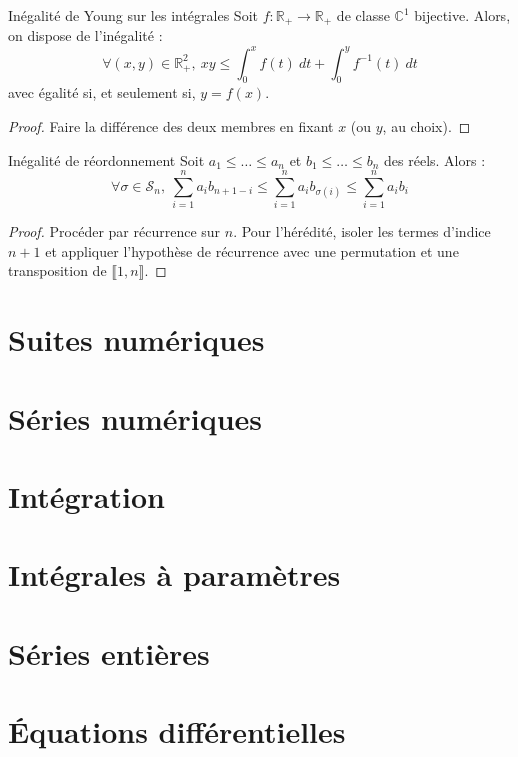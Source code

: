 \documentclass[french]{article}
\newcommand{\R}{\mathbb{R}}
\newcommand{\C}{\mathbb{C}}
\newcommand{\inv}{^{-1}}
\theoremstyle{definition}
\begin{document}
\begin{lem}{Inégalité de Young sur les intégrales}
	Soit $f:\R_+\to\R_+$ de classe $\C^1$ bijective. Alors, on dispose de l'inégalité : $$\forall (x,y)\in\R_+^2,\ xy\leqslant\int_{0}^{x}f(t)\ dt+\int_{0}^{y}f\inv(t)\ dt$$ avec égalité si, et seulement si, $y=f(x)$.
\end{lem}
\begin{proof}
	Faire la différence des deux membres en fixant $x$ (ou $y$, au choix).
\end{proof}
\begin{lem}{Inégalité de réordonnement}
	Soit $a_1\leqslant\ldots\leqslant a_n$ et $b_1\leqslant\ldots\leqslant b_n$ des réels. Alors : $$\forall\sigma\in\mathcal{S}_n,\ \sum_{i=1}^{n}a_ib_{n+1-i}\leqslant\sum_{i=1}^{n}a_ib_{\sigma(i)}\leqslant\sum_{i=1}^{n}a_ib_i$$
\end{lem}
\begin{proof}
	Procéder par récurrence sur $n$. Pour l'hérédité, isoler les termes d'indice $n+1$ et appliquer l'hypothèse de récurrence avec une permutation et une transposition de $\llbracket1,n\rrbracket$.
\end{proof}

\section{Suites numériques}

\section{Séries numériques}

\section{Intégration}

\section{Intégrales à paramètres}

\section{Séries entières}

\section{Équations différentielles}
\end{document}

